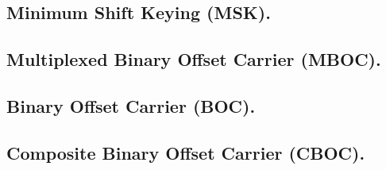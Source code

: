 \subsection*{\fontsize{12}{18}\selectfont Minimum Shift Keying (MSK).}

\begin{justify}
\end{justify}

\subsection*{\fontsize{12}{18}\selectfont Multiplexed Binary Offset Carrier (MBOC).}

\begin{justify}
\end{justify}

\subsection*{\fontsize{12}{18}\selectfont Binary Offset Carrier (BOC).}

\begin{justify}
\end{justify}

\subsection*{\fontsize{12}{18}\selectfont Composite Binary Offset Carrier (CBOC).}

\begin{justify}
\end{justify}